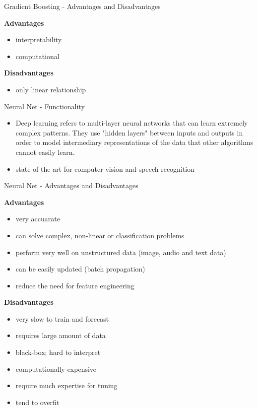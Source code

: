 \documentclass[11pt,compress,t,notes=noshow, xcolor=table]{beamer}
\begin{document}
\begin{frame}{Gradient Boosting - Advantages and Disadvantages}

\textbf{Advantages}
\begin{itemize}
\item interpretability
\item computational 
\end{itemize}


\textbf{Disadvantages}
\begin{itemize}
\item only linear relationship
\end{itemize}
\end{frame}



\begin{frame}{Neural Net - Functionality}

\begin{itemize}
\item Deep learning refers to multi-layer neural networks that can learn extremely complex patterns. They use "hidden layers" between inputs and outputs in order to model intermediary representations of the data that other algorithms cannot easily learn.
\item state-of-the-art for computer vision and speech recognition
\end{itemize}


\end{frame}

\begin{frame}{Neural Net  - Advantages and Disadvantages}

\textbf{Advantages}
\begin{itemize}
\item very accuarate
\item can solve complex, non-linear or classification problems 
\item perform very well on unstructured data (image, audio and text data)
\item can be easily updated (batch propagation)
\item reduce the need for feature engineering

\end{itemize}


\textbf{Disadvantages}
\begin{itemize}
\item very slow to train and forecast
\item requires large amount of data
\item black-box; hard to interpret
\item computationally expensive
\item require much expertise for tuning
\item tend to overfit
\end{itemize}
\end{frame}
\end{document}
